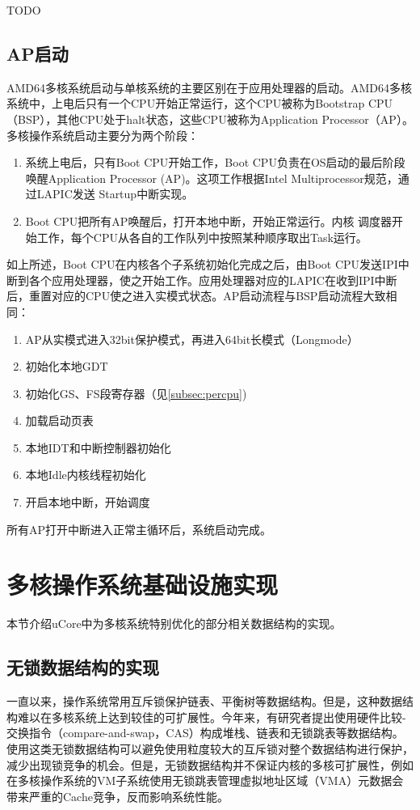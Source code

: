 TODO

\subsection{AP启动}
AMD64多核系统启动与单核系统的主要区别在于应用处理器的启动。AMD64多核系统中，上电后只有一个CPU开始正常运行，这个CPU被称为Bootstrap CPU（BSP），其他CPU处于halt状态，这些CPU被称为Application Processor（AP）\cite{intelmp}。多核操作系统启动主要分为两个阶段：

	\begin{enumerate}
		\item 系统上电后，只有Boot CPU开始工作，Boot
	CPU负责在OS启动的最后阶段唤醒Application Processor
	(AP)。这项工作根据Intel Multiprocessor规范，通过LAPIC发送
	Startup中断实现。

		\item Boot CPU把所有AP唤醒后，打开本地中断，开始正常运行。内核
	调度器开始工作，每个CPU从各自的工作队列中按照某种顺序取出Task运行。
	\end{enumerate}


如上所述，Boot CPU在内核各个子系统初始化完成之后，由Boot CPU发送IPI中断到各个应用处理器，使之开始工作。应用处理器对应的LAPIC在收到IPI中断后，重置对应的CPU使之进入实模式状态。AP启动流程与BSP启动流程大致相同：

\begin{enumerate}
\item AP从实模式进入32bit保护模式，再进入64bit长模式（Longmode）
\item 初始化本地GDT
\item 初始化GS、FS段寄存器（见\ref{subsec:percpu})
\item 加载启动页表
\item 本地IDT和中断控制器初始化
\item 本地Idle内核线程初始化
\item 开启本地中断，开始调度
\end{enumerate}

所有AP打开中断进入正常主循环后，系统启动完成。

\section{多核操作系统基础设施实现}
本节介绍uCore中为多核系统特别优化的部分相关数据结构的实现。

\subsection{无锁数据结构的实现}
一直以来，操作系统常用互斥锁保护链表、平衡树等数据结构。但是，这种数据结构难以在多核系统上达到较佳的可扩展性。今年来，有研究者\cite{Fraser:2007:CPW:1233307.1233309}提出使用硬件比较-交换指令（compare-and-swap，CAS）构成堆栈、链表和无锁跳表等数据结构。使用这类无锁数据结构可以避免使用粒度较大的互斥锁对整个数据结构进行保护，减少出现锁竞争的机会。但是，无锁数据结构并不保证内核的多核可扩展性，例如在多核操作系统的VM子系统使用无锁跳表管理虚拟地址区域（VMA）元数据会带来严重的Cache竞争\cite{radixvm:2013}，反而影响系统性能。

